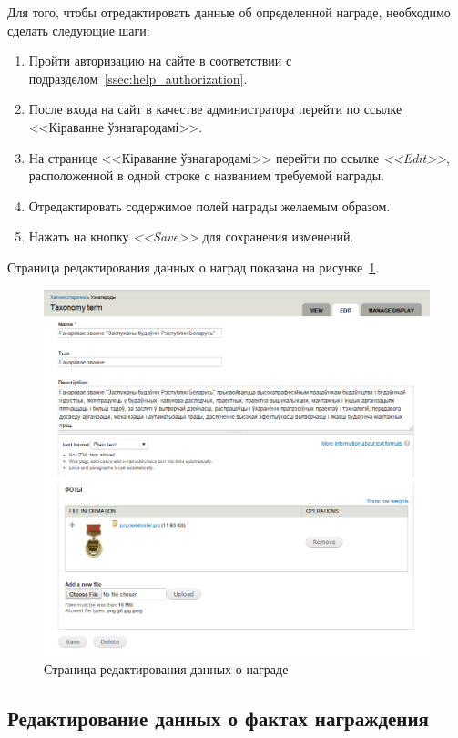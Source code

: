 Для того, чтобы отредактировать данные об определенной награде,
необходимо сделать следующие шаги:

\begin{enumerate}
\item Пройти авторизацию на сайте в соответствии с подразделом~\ref{ssec:help_authorization}.
\item После входа на сайт в качестве администратора
   перейти по ссылке <<Кіраванне ўзнагародамі>>.
\item На странице <<Кіраванне ўзнагародамі>> перейти по ссылке \textit{<<Edit>>},
  расположенной в одной строке с названием требуемой награды.
\item Отредактировать содержимое полей награды желаемым образом.
\item Нажать на кнопку \textit{<<Save>>} для сохранения изменений.
\end{enumerate}

Страница редактирования данных о наград показана 
на рисунке~\ref{fig:awards_edit_page}.

\begin{figure}[h]
  \centering
  \includegraphics[width=150mm]{pic/awards_edit_page.png}
  \caption{Страница редактирования данных о награде}
  \label{fig:awards_edit_page}
\end{figure}


\subsection{Редактирование данных о фактах награждения}
\label{ssec:help_edit_awarded}

